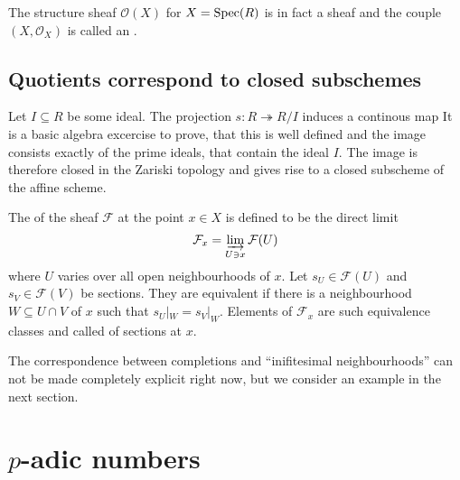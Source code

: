The structure sheaf $\mathcal{O}(X)$ for $X=\operatorname{Spec}(R)$ is in fact a sheaf and the couple $(X, \mathcal{O}_X)$ is called an .

\subsection*{Quotients correspond to closed subschemes}
\label{sub:quotients_corres}
Let $I \subseteq R$ be some ideal.
The projection $s \colon R \twoheadrightarrow R/I$ induces a continous map
It is a basic algebra excercise to prove, that this is well defined and the image consists exactly of the prime ideals, that contain the ideal $I$.
The image is therefore closed in the Zariski topology and gives rise to a closed subscheme of the affine scheme.

\begin{definition}[{name=[stalk and germs]}]
	The  of the sheaf $\mathcal{F}$ at the point $x \in X$ is defined to be the direct limit 
	\[
		\mathcal{F}_x = \varinjlim_{U \ni x} \mathcal{F}(U)
	\]
	where $U$ varies over all open neighbourhoods of $x$.
	Let $s_U \in \mathcal{F}(U)$ and $s_V \in \mathcal{F}(V)$ be sections.
	They are equivalent if there is a neighbourhood $W \subseteq U \cap V$ of $x$ such that $s_U|_W = s_V|_W$.
	Elements of $\mathcal{F}_x$ are such equivalence classes and called  of sections at $x$.
\end{definition}

The correspondence between completions and \enquote{inifitesimal neighbourhoods} can not be made completely explicit right now, but we consider an example in the next section. 

\section{$p$-adic numbers}
\label{sec:p-adic numbers}

